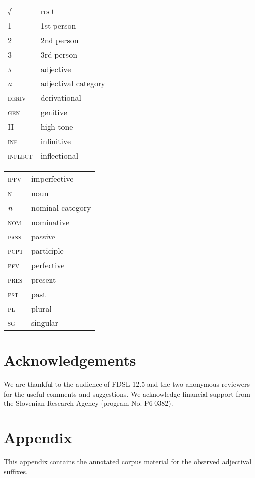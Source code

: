 \documentclass[output=paper]{langsci/langscibook}
\begin{document}
\begin{tabularx}{.45\textwidth}{@{}lX@{}}
\textsc{\textsc{√}}&root\\
\textsc{1}&1st person\\
\textsc{2}&2nd person\\
\textsc{3}&3rd person\\
\textsc{a}&adjective\\
\textit{\textit{a}}&adjectival category\\
\textsc{deriv}&derivational\\
\textsc{gen}&genitive\\
\textsc{H}&high tone\\
\textsc{inf}&infinitive\\
\textsc{inflect}&inflectional\\
\end{tabularx}
\begin{tabularx}{.45\textwidth}{@{}lX@{}}
\textsc{\textsc{ipfv}}&imperfective\\
\textsc{n}&noun\\
\textit{\textit{n}}&nominal category\\
\textsc{nom}&nominative\\
\textsc{\textsc{pass}}&passive\\
\textsc{\textsc{pcpt}}&participle\\
\textsc{\textsc{pfv}}&perfective\\
\textsc{\textsc{pres}}&present\\
\textsc{\textsc{pst}}&past\\
\textsc{pl}&plural\\
\textsc{sg}&singular\\
\end{tabularx}

\section*{Acknowledgements}

We are thankful to the audience of FDSL 12.5 and the two anonymous reviewers for the useful comments and suggestions. We acknowledge financial support from the Slovenian Research Agency (program No. P6-0382).

\section*{Appendix}\label{secapp}

This appendix contains the annotated corpus material for the observed adjectival suffixes.
\end{document}

